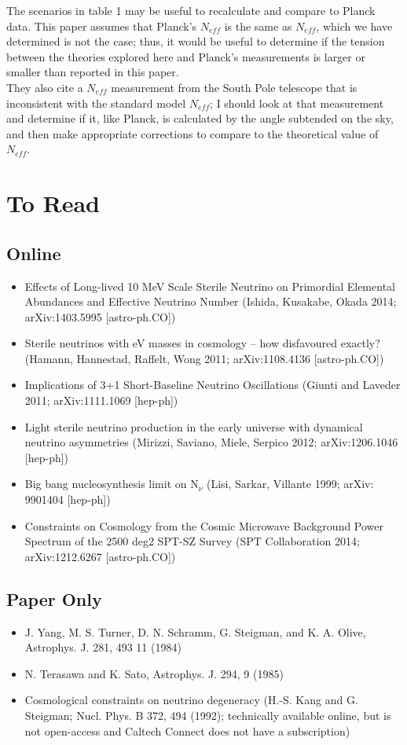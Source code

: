 \documentclass[english]{article}
\begin{document}
\noindent The scenarios in table 1 may be useful to recalculate and compare to Planck data.  This paper assumes that Planck's $N_{eff}$ is the same as $N_{eff}$, which we have determined is not the case; thus, it would be useful to determine if the tension between the theories explored here and Planck's measurements is larger or smaller than reported in this paper. \\

\noindent They also cite a $N_{eff}$ measurement from the South Pole telescope that is inconsistent with the standard model $N_{eff}$; I should look at that measurement and determine if it, like Planck, is calculated by the angle subtended on the sky, and then make appropriate corrections to compare to the theoretical value of $N_{eff}$. \\

\section{To Read}
\subsection{Online}
\begin{itemize}
\item Effects of Long-lived 10 MeV Scale Sterile Neutrino on Primordial Elemental Abundances and Effective Neutrino Number (Ishida, Kusakabe, Okada 2014; arXiv:1403.5995 [astro-ph.CO])
\item Sterile neutrinos with eV masses in cosmology -- how disfavoured exactly? (Hamann, Hannestad, Raffelt, Wong 2011; arXiv:1108.4136 [astro-ph.CO])
\item Implications of 3+1 Short-Baseline Neutrino Oscillations (Giunti and Laveder 2011; arXiv:1111.1069 [hep-ph])
\item Light sterile neutrino production in the early universe with dynamical neutrino asymmetries (Mirizzi, Saviano, Miele, Serpico 2012; arXiv:1206.1046 [hep-ph])
\item Big bang nucleosynthesis limit on N$_\nu$ (Lisi, Sarkar, Villante 1999; arXiv: 9901404 [hep-ph])
\item Constraints on Cosmology from the Cosmic Microwave Background Power Spectrum of the 2500 deg2 SPT-SZ Survey (SPT Collaboration 2014; arXiv:1212.6267 [astro-ph.CO])
\end{itemize}

\subsection{Paper Only}
\begin{itemize}
\item J. Yang, M. S. Turner, D. N. Schramm, G. Steigman, and K. A. Olive, Astrophys. J. 281, 493 11 (1984)
\item N. Terasawa and K. Sato, Astrophys. J. 294, 9 (1985)
\item Cosmological constraints on neutrino degeneracy (H.-S. Kang and G. Steigman; Nucl. Phys. B 372, 494 (1992); technically available online, but is not open-access and Caltech Connect does not have a subscription)
\end{itemize}
\end{document}

